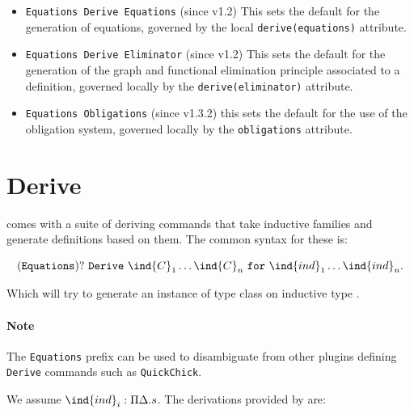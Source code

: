 \begin{itemize}
\item \texttt{Equations Derive Equations} (since v1.2) This sets the default for
  the generation of equations, governed by the local
  \texttt{derive(equations)} attribute.

\item \texttt{Equations Derive Eliminator} (since v1.2) This sets the default for the
  generation of the graph and functional elimination principle
  associated to a definition, governed locally by the
  \texttt{derive(eliminator)} attribute.

\item \texttt{Equations Obligations} (since v1.3.2) this sets the default for the
  use of the obligation system, governed locally by the \texttt{obligations}
  attribute.
\end{itemize}

\section{Derive}

\Equations comes with a suite of deriving commands that take inductive
families and generate definitions based on them. The common syntax for
these is:

\[(\mathtt{Equations})?~\mathtt{Derive}~\ind{C}_1 \ldots \ind{C}_n~\mathtt{for}~\ind{ind}_1 \ldots \ind{ind}_n.\]

Which will try to generate an instance of type class  on
inductive type . 

\paragraph{Note} The \texttt{Equations} prefix can be used to disambiguate
from other plugins defining \texttt{Derive} commands such as \texttt{QuickChick}.  

We assume $\ind{ind}_i : \Pi \Delta. s$. The derivations provided by \Equations are:

